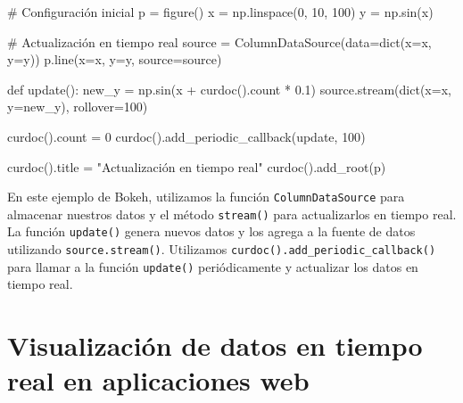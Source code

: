 \documentclass[
  a4paper,
]{article}
\newenvironment{Shaded}{}{}
\newcommand{\BuiltInTok}[1]{\textcolor[rgb]{0.84,0.23,0.29}{#1}}
\newcommand{\CommentTok}[1]{\textcolor[rgb]{0.42,0.45,0.49}{#1}}
\newcommand{\DecValTok}[1]{\textcolor[rgb]{0.00,0.36,0.77}{#1}}
\newcommand{\FloatTok}[1]{\textcolor[rgb]{0.00,0.36,0.77}{#1}}
\newcommand{\KeywordTok}[1]{\textcolor[rgb]{0.84,0.23,0.29}{#1}}
\newcommand{\NormalTok}[1]{\textcolor[rgb]{0.14,0.16,0.18}{#1}}
\newcommand{\OperatorTok}[1]{\textcolor[rgb]{0.14,0.16,0.18}{#1}}
\newcommand{\StringTok}[1]{\textcolor[rgb]{0.01,0.18,0.38}{#1}}
\begin{document}
\begin{Shaded}
\begin{Highlighting}[]
\CommentTok{\# Configuración inicial}
\NormalTok{p }\OperatorTok{=}\NormalTok{ figure()}
\NormalTok{x }\OperatorTok{=}\NormalTok{ np.linspace(}\DecValTok{0}\NormalTok{, }\DecValTok{10}\NormalTok{, }\DecValTok{100}\NormalTok{)}
\NormalTok{y }\OperatorTok{=}\NormalTok{ np.sin(x)}

\CommentTok{\# Actualización en tiempo real}
\NormalTok{source }\OperatorTok{=}\NormalTok{ ColumnDataSource(data}\OperatorTok{=}\BuiltInTok{dict}\NormalTok{(x}\OperatorTok{=}\NormalTok{x, y}\OperatorTok{=}\NormalTok{y))}
\NormalTok{p.line(x}\OperatorTok{=}\StringTok{\textquotesingle{}x\textquotesingle{}}\NormalTok{, y}\OperatorTok{=}\StringTok{\textquotesingle{}y\textquotesingle{}}\NormalTok{, source}\OperatorTok{=}\NormalTok{source)}


\KeywordTok{def}\NormalTok{ update():}
\NormalTok{    new\_y }\OperatorTok{=}\NormalTok{ np.sin(x }\OperatorTok{+}\NormalTok{ curdoc().count }\OperatorTok{*} \FloatTok{0.1}\NormalTok{)}
\NormalTok{    source.stream(}\BuiltInTok{dict}\NormalTok{(x}\OperatorTok{=}\NormalTok{x, y}\OperatorTok{=}\NormalTok{new\_y), rollover}\OperatorTok{=}\DecValTok{100}\NormalTok{)}


\NormalTok{curdoc().count }\OperatorTok{=} \DecValTok{0}
\NormalTok{curdoc().add\_periodic\_callback(update, }\DecValTok{100}\NormalTok{)}

\NormalTok{curdoc().title }\OperatorTok{=} \StringTok{"Actualización en tiempo real"}
\NormalTok{curdoc().add\_root(p)}
\end{Highlighting}
\end{Shaded}

En este ejemplo de Bokeh, utilizamos la función
\texttt{ColumnDataSource} para almacenar nuestros datos y el método
\texttt{stream()} para actualizarlos en tiempo real. La función
\texttt{update()} genera nuevos datos y los agrega a la fuente de datos
utilizando \texttt{source.stream()}. Utilizamos
\texttt{curdoc().add\_periodic\_callback()} para llamar a la función
\texttt{update()} periódicamente y actualizar los datos en tiempo real.

\hypertarget{visualizaciuxf3n-de-datos-en-tiempo-real-en-aplicaciones-web}{%
\section{Visualización de datos en tiempo real en aplicaciones
web}\label{visualizaciuxf3n-de-datos-en-tiempo-real-en-aplicaciones-web}}
\end{document}

